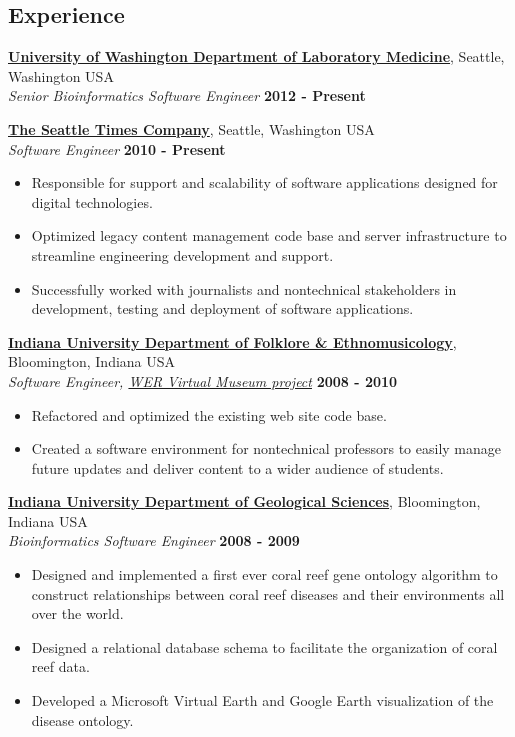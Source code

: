 \documentclass{res}
\begin{document}
\address{1136B 15th Ave\\Seattle, WA 98122} 
\address{\textit{T:} (630) 788-0468\\\textit{Email:} crosenth@gmail.com}
\begin{resume}

\section{Experience}

\href{http://depts.washington.edu/labweb/}{\textbf{University of Washington Department of Laboratory Medicine}},
Seattle, Washington USA\\
\textit{Senior Bioinformatics Software Engineer} \hfill \textbf{2012 - Present}

\href{http://www.seattletimes.com/}{\textbf{The Seattle Times Company}},
Seattle, Washington USA\\
\textit{Software Engineer} \hfill \textbf{2010 - Present}
\begin{itemize} \itemsep -2pt
\item Responsible for support and scalability of software applications designed for digital technologies.
\item Optimized legacy content management code base and server infrastructure to streamline engineering development and support.
\item Successfully worked with journalists and nontechnical stakeholders in development, testing and deployment of software applications.
\end{itemize}

\href{http://www.indiana.edu/~folklore/}{\textbf{Indiana University Department of Folklore \& Ethnomusicology}}, Bloomington, Indiana USA\\
\textit{Software Engineer, \href{http://www.iub.edu/~wer/}{WER Virtual Museum project}} \hfill \textbf{2008 - 2010}
\begin{itemize} \itemsep -2pt
\item Refactored and optimized the existing web site code base.
\item Created a software environment for nontechnical professors to easily manage future updates and deliver content to a wider audience of students.
\end{itemize}

\href{http://geology.indiana.edu/}{\textbf{Indiana University Department of Geological Sciences}}, Bloomington, Indiana USA\\
\textit{Bioinformatics Software Engineer} \hfill \textbf{2008 - 2009}
\begin{itemize} \itemsep -2pt
\item Designed and implemented a first ever coral reef gene ontology algorithm to construct relationships between coral reef diseases and their environments all over the world.
\item Designed a relational database schema to facilitate the organization of coral reef data.
\item Developed a Microsoft Virtual Earth and Google Earth visualization of the disease ontology.
\end{itemize}


\end{resume}
\end{document}
